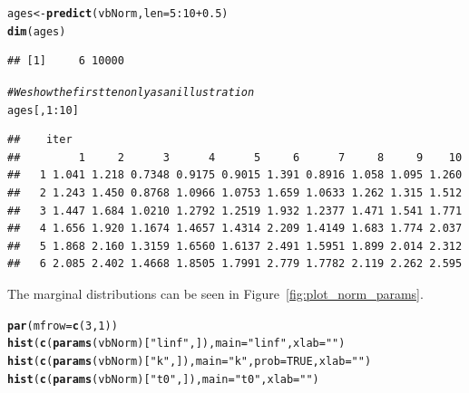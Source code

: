 \documentclass[a4paper,english,10pt]{article}\usepackage[]{graphicx}\usepackage[]{color}
\makeatletter
\newcommand{\hlnum}[1]{\textcolor[rgb]{0.686,0.059,0.569}{#1}}%
\newcommand{\hlstr}[1]{\textcolor[rgb]{0.192,0.494,0.8}{#1}}%
\newcommand{\hlcom}[1]{\textcolor[rgb]{0.678,0.584,0.686}{\textit{#1}}}%
\newcommand{\hlopt}[1]{\textcolor[rgb]{0,0,0}{#1}}%
\newcommand{\hlstd}[1]{\textcolor[rgb]{0.345,0.345,0.345}{#1}}%
\newcommand{\hlkwb}[1]{\textcolor[rgb]{0.69,0.353,0.396}{#1}}%
\newcommand{\hlkwc}[1]{\textcolor[rgb]{0.333,0.667,0.333}{#1}}%
\newcommand{\hlkwd}[1]{\textcolor[rgb]{0.737,0.353,0.396}{\textbf{#1}}}%
\newenvironment{kframe}{%
 \def\at@end@of@kframe{}%
 \ifinner\ifhmode%
  \def\at@end@of@kframe{\end{minipage}}%
  \begin{minipage}{\columnwidth}%
 \fi\fi%
 \def\FrameCommand##1{\hskip\@totalleftmargin \hskip-\fboxsep
 \colorbox{shadecolor}{##1}\hskip-\fboxsep
     \hskip-\linewidth \hskip-\@totalleftmargin \hskip\columnwidth}%
 \MakeFramed {\advance\hsize-\width
   \@totalleftmargin\z@ \linewidth\hsize
   \@setminipage}}%
 {\par\unskip\endMakeFramed%
 \at@end@of@kframe}
\newenvironment{knitrout}{}{} %
\makeatother
\begin{document}
\begin{knitrout}
\color{fgcolor}\begin{kframe}
\begin{alltt}
\hlstd{ages} \hlkwb{<-} \hlkwd{predict}\hlstd{(vbNorm,} \hlkwc{len} \hlstd{=} \hlnum{5}\hlopt{:}\hlnum{10} \hlopt{+} \hlnum{0.5}\hlstd{)}
\hlkwd{dim}\hlstd{(ages)}
\end{alltt}
\begin{verbatim}
## [1]     6 10000
\end{verbatim}
\begin{alltt}
\hlcom{# We show the first ten only as an illustration}
\hlstd{ages[,} \hlnum{1}\hlopt{:}\hlnum{10}\hlstd{]}
\end{alltt}
\begin{verbatim}
##    iter
##         1     2      3      4      5     6      7     8     9    10
##   1 1.041 1.218 0.7348 0.9175 0.9015 1.391 0.8916 1.058 1.095 1.260
##   2 1.243 1.450 0.8768 1.0966 1.0753 1.659 1.0633 1.262 1.315 1.512
##   3 1.447 1.684 1.0210 1.2792 1.2519 1.932 1.2377 1.471 1.541 1.771
##   4 1.656 1.920 1.1674 1.4657 1.4314 2.209 1.4149 1.683 1.774 2.037
##   5 1.868 2.160 1.3159 1.6560 1.6137 2.491 1.5951 1.899 2.014 2.312
##   6 2.085 2.402 1.4668 1.8505 1.7991 2.779 1.7782 2.119 2.262 2.595
\end{verbatim}
\end{kframe}
\end{knitrout}


The marginal distributions can be seen in Figure~\ref{fig:plot_norm_params}.
\begin{knitrout}
\color{fgcolor}\begin{kframe}
\begin{alltt}
\hlkwd{par}\hlstd{(}\hlkwc{mfrow} \hlstd{=} \hlkwd{c}\hlstd{(}\hlnum{3}\hlstd{,} \hlnum{1}\hlstd{))}
\hlkwd{hist}\hlstd{(}\hlkwd{c}\hlstd{(}\hlkwd{params}\hlstd{(vbNorm)[}\hlstr{"linf"}\hlstd{, ]),} \hlkwc{main} \hlstd{=} \hlstr{"linf"}\hlstd{,} \hlkwc{xlab} \hlstd{=} \hlstr{""}\hlstd{)}
\hlkwd{hist}\hlstd{(}\hlkwd{c}\hlstd{(}\hlkwd{params}\hlstd{(vbNorm)[}\hlstr{"k"}\hlstd{, ]),} \hlkwc{main} \hlstd{=} \hlstr{"k"}\hlstd{,} \hlkwc{prob} \hlstd{=} \hlnum{TRUE}\hlstd{,} \hlkwc{xlab} \hlstd{=} \hlstr{""}\hlstd{)}
\hlkwd{hist}\hlstd{(}\hlkwd{c}\hlstd{(}\hlkwd{params}\hlstd{(vbNorm)[}\hlstr{"t0"}\hlstd{, ]),} \hlkwc{main} \hlstd{=} \hlstr{"t0"}\hlstd{,} \hlkwc{xlab} \hlstd{=} \hlstr{""}\hlstd{)}
\end{alltt}
\end{kframe}
\end{knitrout}
\end{document}

